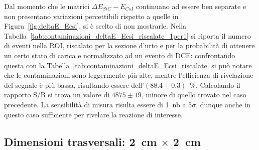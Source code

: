 Dal momento che le matrici $\Delta E_{SiC} - E_{CsI}$ continuano ad essere ben separate e non presentano variazioni percettibili rispetto a quelle in Figura~\ref{fig:deltaE_Ecsi}, si è scelto di non mostrarle.
Nella Tabella~\ref{tab:contaminazioni_deltaE_Ecsi_riscalate_1per1} si riporta il numero di eventi nella ROI, riscalato per la sezione d'urto e per la probabilità di ottenere un certo stato di carica e normalizzato ad un evento di DCE: confrontando questa con la Tabella~\ref{tab:contaminazioni_deltaE_Ecsi_riscalate} si può notare che le contaminazioni sono leggermente più alte, mentre l'efficienza di rivelazione del segnale è più bassa, risultando essere dell'$(88.4 \pm 0.3)$~\%.
Calcolando il rapporto S/B si trova un valore di $4875 \pm 19$, minore di quello trovato nel caso precedente.
La sensibilità di misura risulta essere di 1~nb a 5$\sigma$, dunque anche in questo caso sufficiente per rivelare la reazione di interesse.





\subsection*{Dimensioni trasversali: 2~cm $\times$ 2~cm}

